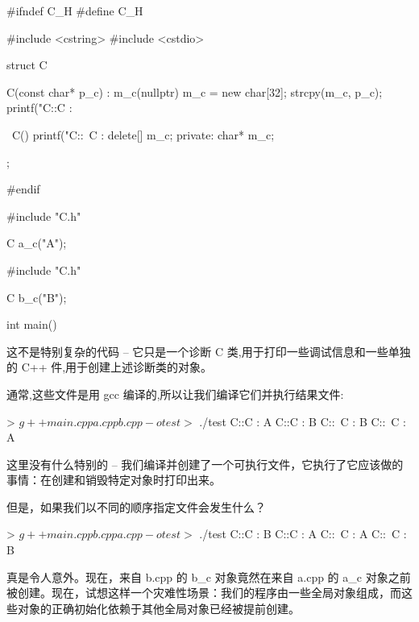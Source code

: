 
\begin{cpp}
#ifndef C_H
#define C_H

#include <cstring>
#include <cstdio>

struct C {
  C(const char* p_c) : m_c(nullptr) {
    m_c = new char[32];
    strcpy(m_c, p_c);
    printf("C::C : %
  }

  ~C() {
    printf("C::~C : %
    delete[] m_c;
  }
private:
  char* m_c;
};

#endif
\end{cpp}


\begin{cpp}
#include "C.h"

C a_c("A");
\end{cpp}


\begin{cpp}
#include "C.h"

C b_c("B");
\end{cpp}


\begin{cpp}
int main()
{ 
}
\end{cpp}

这不是特别复杂的代码 – 它只是一个诊断 C 类,用于打印一些调试信息和一些单独的 C++ 件,用于创建上述诊断类的对象。

通常,这些文件是用 gcc 编译的,所以让我们编译它们并执行结果文件:

\begin{shell}
> $ g++ main.cpp a.cpp b.cpp -o test
> $ ./test
C::C : A
C::C : B
C::~C : B
C::~C : A
\end{shell}

这里没有什么特别的 – 我们编译并创建了一个可执行文件，它执行了它应该做的事情：在创建和销毁特定对象时打印出来。

但是，如果我们以不同的顺序指定文件会发生什么？

\begin{shell}
> $ g++ main.cpp b.cpp a.cpp -o test
> $ ./test
C::C : B
C::C : A
C::~C : A
C::~C : B
\end{shell}

真是令人意外。现在，来自 b.cpp 的 b\_c 对象竟然在来自 a.cpp 的 a\_c 对象之前被创建。现在，试想这样一个灾难性场景：我们的程序由一些全局对象组成，而这些对象的正确初始化依赖于其他全局对象已经被提前创建。

